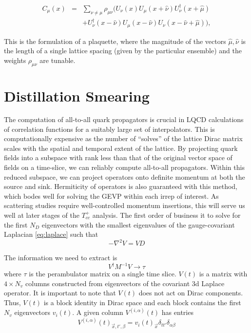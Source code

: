 \begin{eqnarray}
 C_\mu(x)&=&\sum_{\nu\neq \mu}\rho_{\mu\nu}\biggl(
 U_\nu(x) U_\mu(x\!+\!\hat{\nu}) U_\nu^\dagger(x\!+\!\hat{\mu})\nonumber\\
&&+ U^\dagger_\nu(x\!-\!\hat{\nu}) U_\mu(x\!-\!\hat{\nu})
  U_\nu(x\!-\!\hat{\nu}\!+\!\hat{\mu})
\biggr), \label{eq:Cdef}
\end{eqnarray}

This is the formulation of a plaquette, where the magnitude of the vectors $\hat{\mu}, \hat{\nu}$ is the length of a single lattice spacing (given by the particular ensemble) and the weights $\rho_{\mu\nu}$ are tunable. 

\section{Distillation Smearing}
The computation of all-to-all quark propagators is crucial in LQCD calculations of correlation functions for a suitably large set of interpolators. This is computationally expensive as the number of ``solves'' of the lattice Dirac matrix scales with the spatial and temporal extent of the lattice. By projecting quark fields into a subspace with rank less than that of the original vector space of fields on a time-slice, we can reliably compute all-to-all propagators\cite{peardon_novel_2009}. Within this reduced subspace, we can project operators onto definite momentum at both the source and sink. Hermiticity of operators is also guaranteed with this method, which bodes well for solving the GEVP within each irrep of interest. As scattering studies require well-controlled momentum insertions, this will serve us well at later stages of the $T_{cc}^+$ analysis.  
The first order of business it to solve for the first $N_D$ eigenvectors with the smallest eigenvalues of the gauge-covariant Laplacian \ref{eq:laplace} such that 
\begin{equation}\label{eq:eigs}
    -\nabla^2V = VD
\end{equation} 

The information we need to extract is 
$$ V^{\dagger}M^{-1}V \rightarrow \tau $$ 
where $\tau$ is the perambulator matrix on a single time slice. 
$V(t)$ is a matrix with $4 \times N_v $  columns constructed from eigenvectors of the covariant 3d Laplace operator. It is important to note that $V(t)$ does not act on Dirac components. Thus, $V(t)$ is a block identity in Dirac space and each block contains the first $N_v$ eigenvectors $v_i(t)$. A given column $V^{(i,\alpha)}(t)$ has entries 
\[V^{(i,\alpha)}(t)_{\vec{x},t',\beta} = v_i(t)_{\vec{x}} \delta_{tt'}\delta_{\alpha\beta}\]


